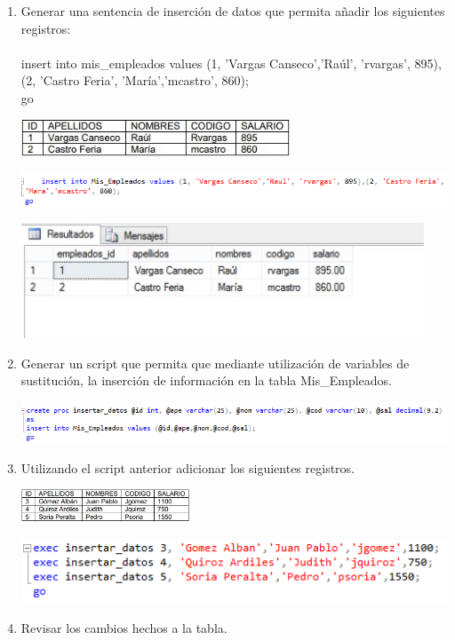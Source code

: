 \begin{enumerate}[1.]
	\item Generar una sentencia de inserción de datos que permita añadir los siguientes registros:
	\\
	\\ insert into mis\_empleados values (1, 'Vargas Canseco','Raúl', 'rvargas', 895),(2, 'Castro Feria',  'María','mcastro', 860);
	\\ go

	\begin{center}
	\includegraphics[width=8cm]{./Imagenes/imagen0103} 
	\end{center}
	\begin{center}
	\includegraphics[width=20cm]{./Imagenes/2} 
	\end{center}
	\begin{center}
	\includegraphics[width=12cm]{./Imagenes/img3} 
	\end{center}
	\item Generar un script que permita que mediante utilización de variables de sustitución, la inserción de información en la tabla Mis\_Empleados.
	\begin{center}
	\includegraphics[width=18cm]{./Imagenes/3} 
	\end{center}
	\item Utilizando el script anterior adicionar los siguientes registros.
	\begin{center}
	\includegraphics[width=5cm]{./Imagenes/imagen0105} 
	\end{center}
	\begin{center}
	\includegraphics[width=18cm]{./Imagenes/4} 
	\end{center}
	\item Revisar los cambios hechos a la tabla.
	\\
	

\end{enumerate}
